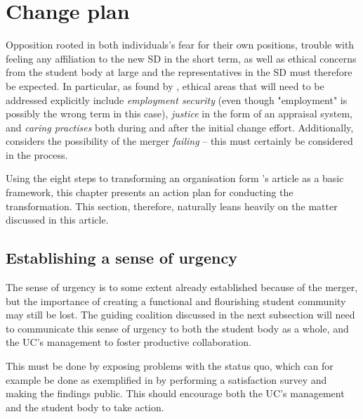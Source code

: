 \section{Change plan}

Opposition rooted in both individuals's fear for their own positions, trouble with feeling any affiliation to the new SD in the short term, as well as ethical concerns from the student body at large and the representatives in the SD must therefore be expected. In particular, as found by \autocite{lin-wei:the-role-of-business-ethics-in-merger-and-acquisition-success:2006}, ethical areas that will need to be addressed explicitly include \textit{employment security} (even though "employment" is possibly the wrong term in this case), \textit{justice} in the form of an appraisal system, and \textit{caring practises} both during and after the initial change effort. Additionally, \autocite[8]{mcgee:some-overlooked-ethical-issues-in-acquisitions-and-mergers:2004} considers the possibility of the merger \textit{failing} -- this must certainly be considered in the process.

Using the eight steps to transforming an organisation form \citeauthor{kotter:leading-change-why-transformation-efforts-fail:1995}'s \citeyear{kotter:leading-change-why-transformation-efforts-fail:1995} article  as a basic framework, this chapter presents an action plan for conducting the transformation. This section, therefore, naturally leans heavily on the matter discussed in this article.

\subsection{Establishing a sense of urgency}

The sense of urgency is to some extent already established because of the merger, but the importance of creating a functional and flourishing student community may still be lost. The guiding coalition discussed in the next subsection will need to communicate this sense of urgency to both the student body as a whole, and the UC's management to foster productive collaboration.

This must be done by exposing problems with the status quo, which can for example be done as exemplified in \autocite{kotter:leading-change-why-transformation-efforts-fail:1995} by performing a satisfaction survey and making the findings public. This should encourage both the UC's management and the student body to take action.

